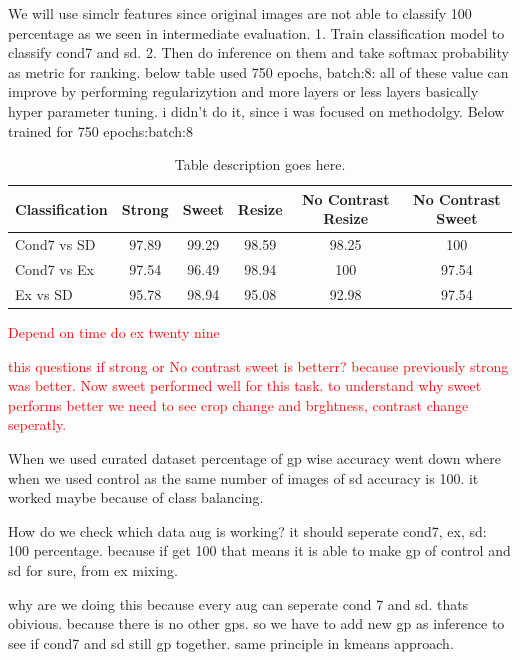 We will use simclr features since original images are not able to classify 100 percentage as we seen in intermediate evaluation.
1. Train classification model to classify cond7 and sd. 
2. Then do inference on them and take softmax probability as metric for ranking.
below table used 750 epochs, batch:8: all of these value can improve by performing regularizytion and more layers or less layers basically hyper parameter tuning. 
i didn't do it, since i was focused on methodolgy.
Below trained for 750 epochs:batch:8
\begin{table}[H]
  \centering
  \begin{tabular}{@{}lccccc@{}}
  \toprule
  \textbf{Classification} & \textbf{Strong} & \textbf{Sweet} & \textbf{Resize} & \textbf{No Contrast Resize} & \textbf{No Contrast Sweet} \\ \midrule
  Cond7 vs SD             & 97.89           & 99.29          & 98.59           & 98.25                       & 100                        \\
  Cond7 vs Ex             & 97.54               & 96.49              & 98.94               & 100                           &   97.54                        \\
  Ex vs SD             & 95.78               & 98.94              & 95.08               & 92.98                           & 97.54                         \\ \bottomrule
  \end{tabular}
  \caption{Table description goes here.}
  \label{tab:ranking softmax}
\end{table}

\textcolor{red}{Depend on time do ex twenty nine}
  
\textcolor{red}{this questions if strong or No contrast sweet is betterr? because previously strong was better. Now sweet performed well for this task. 
to understand why sweet performs better we need to see crop change and brghtness, contrast change seperatly.}

When we used curated dataset percentage of gp wise accuracy went down where when we used control as the same number of images of sd accuracy is 100. 
it worked maybe because of class balancing.

How do we check which data aug is working?
it should seperate cond7, ex, sd: 100 percentage. because if get 100 that means it is able to make gp of control and sd for sure, from ex mixing.

why are we doing this because every aug can  seperate cond 7 and sd. thats obivious. because there is no other gps. so we have to add new gp as inference to see if 
cond7 and sd still gp together. same principle in kmeans approach.

